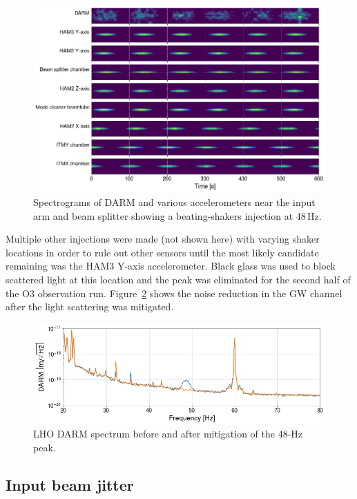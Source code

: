 \begin{figure}[h!]
	\centering
	\includegraphics[width=\textwidth]{figures/noise-beat-spectrograms.png}
	\caption{
		Spectrograms of DARM and various accelerometers near the input arm and beam splitter showing a beating-shakers injection at 48\,Hz.}
	\label{fig:noise_beats}
\end{figure}

Multiple other injections were made (not shown here) with varying shaker locations in order to rule out other sensors until the most likely candidate remaining was the HAM3 Y-axis accelerometer.
Black glass was used to block scattered light at this location and the peak was eliminated for the second half of the O3 observation run.
Figure~\ref{fig:noise_48hz} shows the noise reduction in the \ac{GW} channel after the light scattering was mitigated.

\begin{figure}
	\centering
	\includegraphics[width=\textwidth]{figures/noise-48Hz.png}
	\caption{LHO DARM spectrum before and after mitigation of the 48-Hz peak.}
	\label{fig:noise_48hz}
\end{figure}

\subsection{Input beam jitter}\label{sec:noise-vib-jitter}

